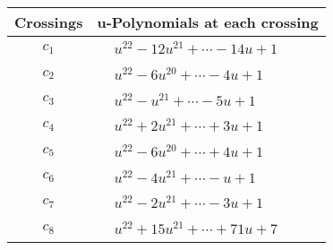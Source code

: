 \documentclass[1p]{elsarticle_modified}
\theoremstyle{definition}
\begin{document}
\begin{tabular}{m{50pt}|m{274pt}}
Crossings & \hspace{64pt}u-Polynomials at each crossing \\
\hline $$\begin{aligned}c_{1}\end{aligned}$$&$\begin{aligned}
&u^{22}-12 u^{21}+\cdots-14 u+1
\end{aligned}$\\
\hline $$\begin{aligned}c_{2}\end{aligned}$$&$\begin{aligned}
&u^{22}-6 u^{20}+\cdots-4 u+1
\end{aligned}$\\
\hline $$\begin{aligned}c_{3}\end{aligned}$$&$\begin{aligned}
&u^{22}- u^{21}+\cdots-5 u+1
\end{aligned}$\\
\hline $$\begin{aligned}c_{4}\end{aligned}$$&$\begin{aligned}
&u^{22}+2 u^{21}+\cdots+3 u+1
\end{aligned}$\\
\hline $$\begin{aligned}c_{5}\end{aligned}$$&$\begin{aligned}
&u^{22}-6 u^{20}+\cdots+4 u+1
\end{aligned}$\\
\hline $$\begin{aligned}c_{6}\end{aligned}$$&$\begin{aligned}
&u^{22}-4 u^{21}+\cdots- u+1
\end{aligned}$\\
\hline $$\begin{aligned}c_{7}\end{aligned}$$&$\begin{aligned}
&u^{22}-2 u^{21}+\cdots-3 u+1
\end{aligned}$\\
\hline $$\begin{aligned}c_{8}\end{aligned}$$&$\begin{aligned}
&u^{22}+15 u^{21}+\cdots+71 u+7
\end{aligned}$\\

\end{tabular}
\end{document}
